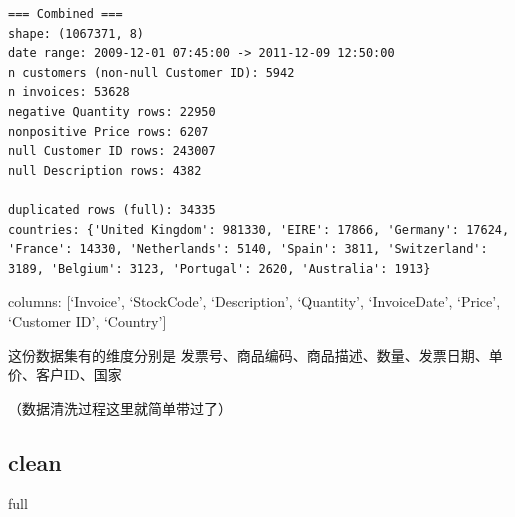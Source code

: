 \documentclass[
]{ctexart}
\newenvironment{Shaded}{\begin{snugshade}}{\end{snugshade}}
\newcommand{\NormalTok}[1]{\textcolor[rgb]{0.00,0.23,0.31}{#1}}
\begin{document}
\begin{verbatim}
=== Combined ===
shape: (1067371, 8)
date range: 2009-12-01 07:45:00 -> 2011-12-09 12:50:00
n customers (non-null Customer ID): 5942
n invoices: 53628
negative Quantity rows: 22950
nonpositive Price rows: 6207
null Customer ID rows: 243007
null Description rows: 4382

duplicated rows (full): 34335
countries: {'United Kingdom': 981330, 'EIRE': 17866, 'Germany': 17624, 'France': 14330, 'Netherlands': 5140, 'Spain': 3811, 'Switzerland': 3189, 'Belgium': 3123, 'Portugal': 2620, 'Australia': 1913}
\end{verbatim}

columns: {[}`Invoice', `StockCode', `Description', `Quantity',
`InvoiceDate', `Price', `Customer ID', `Country'{]}

这份数据集有的维度分别是
发票号、商品编码、商品描述、数量、发票日期、单价、客户ID、国家

（数据清洗过程这里就简单带过了）

\subsection{clean}\label{clean}

\begin{Shaded}
\begin{Highlighting}[]
\NormalTok{full}
\end{Highlighting}
\end{Shaded}
\end{document}
